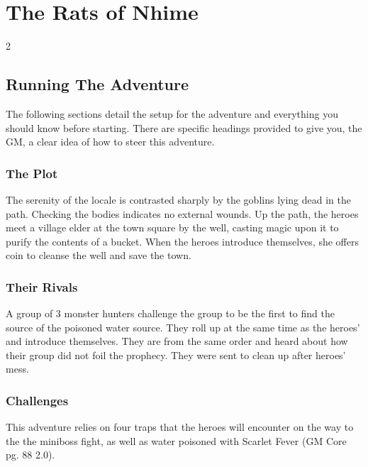 \clearpage

\pfMakeSplashHeader[
  image = oneshot,
  title = The Rats of Nhime,
  headerHeight = -7cm,
  textBodyHeight = 6cm
]

\chapter{The Rats of Nhime}

\begin{multicols}{2}

  \section{Running The Adventure}
  The following sections detail the setup for the adventure and everything you should know before starting. There are specific headings provided to give you, the GM, a clear idea of how to steer this adventure.

  \subsection{The Plot}
  The serenity of the locale is contrasted sharply by the goblins lying dead in the path. Checking  the bodies indicates no external wounds. Up the path, the heroes meet a village elder at the town square by the well, casting magic upon it to purify the contents of a bucket. When the heroes introduce themselves, she offers coin to cleanse the well and save the town.

  \subsection{Their Rivals}
  A group of 3 monster hunters challenge the group to be the first to find the source of the poisoned water source. They roll up at the same time as the heroes' and introduce themselves. They are from the same order and heard about how their group did not foil the prophecy. They were sent to clean up after heroes' mess.

  \subsection{Challenges}
  This adventure relies on four traps that the heroes will encounter on the way to the the miniboss fight, as well as water poisoned with Scarlet Fever (GM Core pg. 88 2.0).


\end{multicols}
